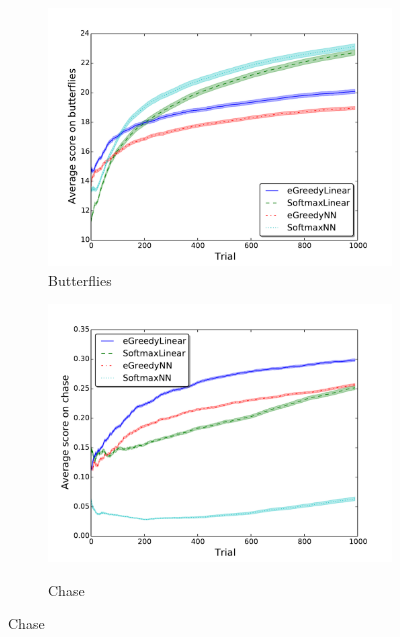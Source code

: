 \documentclass[conference]{IEEEtran}
\begin{document}
\begin{figure}[!t]
\begin{center}
\begin{subfigure} {\lefig\textwidth}
	\includegraphics[width = \textwidth]{img/butterflies_scores}
  \caption{Butterflies}
\end{subfigure}\begin{subfigure} {\lefig\textwidth}
	\includegraphics[width = \textwidth]{img/chase_scores}\\
  \caption{Chase}
  \end{subfigure}


\end{center}
\end{figure}
\end{document}
